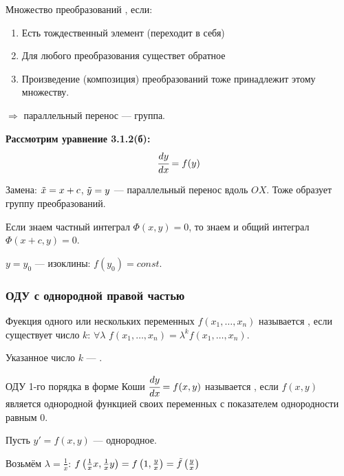 \begin{Def} Множество преобразований , если:
    \begin{enumerate}
        \item Есть тождественный элемент (переходит в себя)
        \item Для любого преобразования существет обратное
        \item Произведение (композиция) преобразований тоже принадлежит этому множеству.
    \end{enumerate}
\end{Def}

$\Rightarrow$ параллельный перенос --- группа.

\textbf{Рассмотрим уравнение 3.1.2(б):}
\begin{equation}\label{3.1.2(б)}
    \cfrac{dy}{dx}=f(y)
\end{equation}

Замена: $\Tilde{x} = x + c$, $\Tilde{y} = y$ --- параллельный перенос вдоль $OX$. Тоже образует группу преобразований.

Если знаем частный интеграл $\Phi(x,y) = 0$, то знаем и общий интеграл $\Phi(x+c, y) = 0$.

$y = y_0$ --- изоклины: $f(y_0) = const$.

\subsubsection{ОДУ с однородной правой частью}

\begin{Def}
    Фуекция одного или нескольких переменных $f(x_1, \ldots, x_n)$ называется , если существует число $k$: $\forall \lambda$ $f(x_1,\ldots,x_n) = \lambda^kf(x_1,\ldots, x_n)$.
    
    Указанное число $k$ --- .
\end{Def}

\begin{Def}
    ОДУ 1-го порядка в форме Коши $\cfrac{dy}{dx} = f(x,y)$ называется , если $f(x,y)$ является однородной функцией своих переменных с показателем однородности равным 0.
\end{Def}

Пусть $y' = f(x,y)$ --- однородное.

Возьмём $\lambda = \frac{1}{x}$: $f\left({\frac{1}{x}x, \frac{1}{x}y}\right) = f\left({1, \frac{y}{x}}\right) = \Tilde{f}\left({\frac{y}{x}}\right)$

